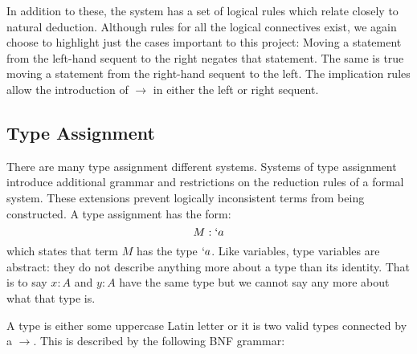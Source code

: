   In addition to these, the system has a set of logical rules which relate closely to natural deduction.
  Although rules for all the logical connectives exist, we again choose to highlight just the cases important to this project:
  Moving a statement from the left-hand sequent to the right negates that statement.
  The same is true moving a statement from the right-hand sequent to the left.
  The implication rules allow the introduction of $\to$ in either the left or right sequent.
  
  \subsection{Type Assignment}\label{sec:type-assignment}
  
  There are many type assignment different systems.
  Systems of type assignment introduce additional grammar and restrictions on the reduction rules of a formal system. 
  These extensions prevent logically inconsistent terms from being constructed. 
  A type assignment has the form:
  \[
    M : `a 
  \]
  which states that term $M$ has the type $`a$. 
  Like variables, type variables are abstract: 
  they do not describe anything more about a type than its identity. 
  That is to say $x: A$ and $y : A$ have the same type but we cannot say any more about what that type is.
 
  A type is either some uppercase Latin letter or it is two valid types connected by a $\rightarrow$. 
  This is described by the following BNF grammar:
  
  

